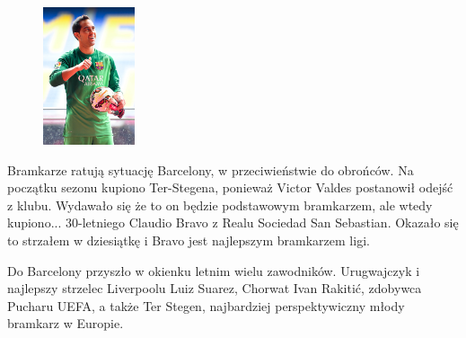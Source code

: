 \documentclass[11pt, a4paper]{article}
\begin{document}
\begin{figure}
\begin{center}
\includegraphics[width=0.24\textwidth]{bravo.jpg}
\end{center}
\label{img:Bravo}
\end{figure}
Bramkarze ratują sytuację Barcelony, w przeciwieństwie do obrońców. Na początku sezonu kupiono Ter-Stegena, ponieważ Victor Valdes postanowił odejść z klubu. Wydawało się że to on będzie podstawowym bramkarzem, ale wtedy kupiono... 30-letniego Claudio Bravo\cite{Bravo} z Realu Sociedad San Sebastian. Okazało się to strzałem w dziesiątkę i Bravo jest najlepszym bramkarzem ligi.
\newpage


Do Barcelony przyszło w okienku letnim wielu zawodników. Urugwajczyk i najlepszy strzelec Liverpoolu Luiz Suarez, Chorwat Ivan Rakitić, zdobywca Pucharu UEFA, a także Ter Stegen, najbardziej perspektywiczny młody bramkarz w Europie.
\end{document}
